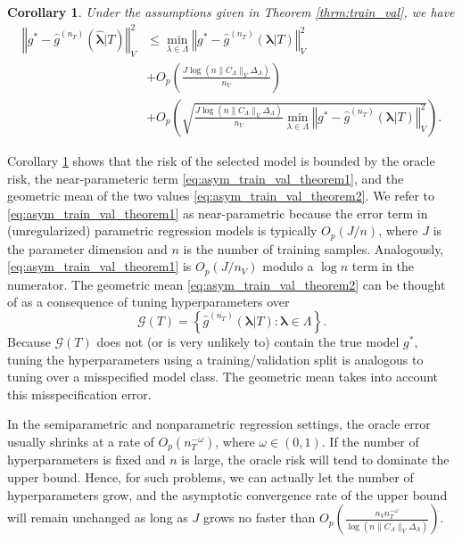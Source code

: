 \documentclass[12pt]{article} %
\newtheorem{corollary}{Corollary}
\theoremstyle{definition}
\begin{document}
\begin{corollary}
	\label{corr:train_val}
	Under the assumptions given in Theorem \ref{thrm:train_val}, we have
	\begin{align}
	\left\Vert g^* - \hat{g}^{(n_T)}( \hat{\boldsymbol{\lambda}} | T) \right\Vert _{V}^2 &
	\le \min_{\lambda \in \Lambda} \left\Vert g^* - \hat{g}^{(n_T)}( {\boldsymbol{\lambda}} | T) \right \Vert^2_{V}
	\label{eq:asym_train_val_oracle_risk}
	\\
	& + O_p \left(\frac{J\log (n \|C_\Lambda\|_V \Delta_{\Lambda} )}{n_{V}} \right)
	\label{eq:asym_train_val_theorem1} \\
	& + O_p \left(
	\sqrt{
		\frac{J \log (n \|C_\Lambda\|_V \Delta_{\Lambda} )}{n_{V}}
		\min_{\lambda \in \Lambda} \left\Vert g^* - \hat{g}^{(n_T)}( {\boldsymbol{\lambda}} | T) \right \Vert^2_{V}
	}
	\right ).
	\label{eq:asym_train_val_theorem2}
	\end{align}
\end{corollary}
\noindent
Corollary \ref{corr:train_val} shows that the risk of the selected model is bounded by the oracle risk, the near-parameteric term \eqref{eq:asym_train_val_theorem1}, and the geometric mean of the two values \eqref{eq:asym_train_val_theorem2}.
We refer to \eqref{eq:asym_train_val_theorem1} as near-parametric because the error term in (unregularized) parametric regression models is typically $O_p(J/n)$, where $J$ is the parameter dimension and $n$ is the number of training samples. Analogously, \eqref{eq:asym_train_val_theorem1} is $O_p(J/n_V)$ modulo a $\log n$ term in the numerator.
The geometric mean \eqref{eq:asym_train_val_theorem2} can be thought of as a consequence of tuning hyperparameters over
\begin{equation}
\mathcal{G}(T) = \left \{ \hat{g}^{(n_T)}( {\boldsymbol{\lambda}}| T) : \boldsymbol{\lambda} \in \Lambda \right \}.
\end{equation}
Because $\mathcal{G}(T)$ does not (or is very unlikely to) contain the true model $g^*$, tuning the hyperparameters using a training/validation split is analogous to tuning over a misspecified model class.
The geometric mean takes into account this misspecification error.

In the semiparametric and nonparametric regression settings, the oracle error usually shrinks at a rate of $O_p(n_T^{-\omega})$, where $\omega \in (0, 1)$.
If the number of hyperparameters is fixed and $n$ is large, the oracle risk will tend to dominate the upper bound.
Hence, for such problems, we can actually let the number of hyperparameters grow, and the asymptotic convergence rate of the upper bound will remain unchanged as long as $J$ grows no faster than
$
O_p\left (
\frac{n_{V} n_T^{-\omega}}{\log (n \|C_\Lambda\|_V \Delta_{\Lambda})}
\right ).
$
\end{document}
